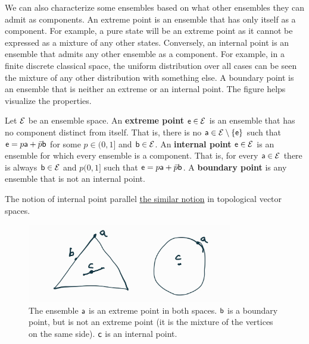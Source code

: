 We can also characterize some ensembles based on what other ensembles they can admit as components. An extreme point is an ensemble that has only itself as a component. For example, a pure state will be an extreme point as it cannot be expressed as a mixture of any other states. Conversely, an internal point is an ensemble that admits any other ensemble as a component. For example, in a finite discrete classical space, the uniform distribution over all cases can be seen the mixture of any other distribution with something else. A boundary point is an ensemble that is neither an extreme or an internal point. The figure helps visualize the properties.

\begin{mathSection}
\begin{defn}
	Let $\Ens$ be an ensemble space. An \textbf{extreme point} $\ens \in \Ens$ is an ensemble that has no component distinct from itself. That is, there is no $\ens[a] \in \Ens\setminus\{ \ens \}$ such that $\ens = p \ens[a] + \bar{p} \ens[b]$ for some $p \in (0,1]$ and $\ens[b] \in \Ens$. An \textbf{internal point} $\ens \in \Ens$ is an ensemble for which every ensemble is a component. That is, for every $\ens[a] \in \Ens$ there is always $\ens[b] \in \Ens$ and $p(0,1]$ such that $\ens = p \ens[a] + \bar{p} \ens[b]$. A \textbf{boundary point} is any ensemble that is not an internal point.
\end{defn}

\begin{remark}
	The notion of internal point parallel \href{https://en.wikipedia.org/wiki/Algebraic_interior}{the similar notion} in topological vector spaces.
\end{remark}

\begin{figure}[H]
	\centering
	\includegraphics[width=0.8\textwidth]{tempimages/InteriorExteriorPoints.jpg}
	\caption{The ensemble $\ens[a]$ is an extreme point in both spaces. $\ens[b]$ is a boundary point, but is not an extreme point (it is the mixture of the vertices on the same side). $\ens[c]$ is an internal point.}
\end{figure}


\end{mathSection}
